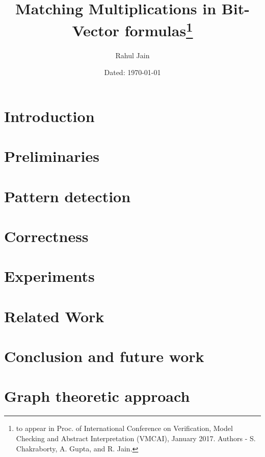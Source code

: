 \documentclass{report}
\begin{document}
\title{Matching Multiplications in Bit-Vector formulas\footnote{to appear in Proc. of International Conference on Verification, Model Checking and Abstract Interpretation (VMCAI), January 2017. Authors - S. Chakraborty, A. Gupta, and R. Jain.}}




\author{Rahul Jain}

\date{Dated: \today}

\maketitle

\begin{abstract}

\end{abstract}


\tableofcontents

%
\chapter{Introduction}
\label{sec:intro}


\chapter{Preliminaries}
\label{sec:prelim}


\chapter{Pattern detection}
\label{sec:pattern}


\chapter{Correctness}
\label{sec:correct}


\chapter{Experiments}
\label{sec:experiments}



 \chapter{Related Work}
 \label{sec:related}
 

\chapter{Conclusion and future work}
\label{sec:conclusion}


\chapter{Graph theoretic approach}
\label{sec:exploratory}




\end{document}
